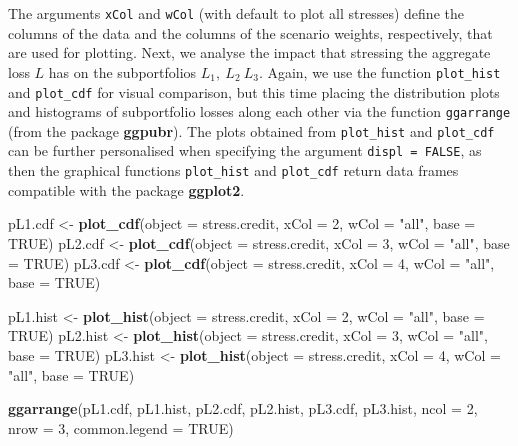 \documentclass[
]{article}
\newenvironment{Shaded}{\begin{snugshade}}{\end{snugshade}}
\newcommand{\DataTypeTok}[1]{\textcolor[rgb]{0.13,0.29,0.53}{#1}}
\newcommand{\DecValTok}[1]{\textcolor[rgb]{0.00,0.00,0.81}{#1}}
\newcommand{\KeywordTok}[1]{\textcolor[rgb]{0.13,0.29,0.53}{\textbf{#1}}}
\newcommand{\NormalTok}[1]{#1}
\newcommand{\OtherTok}[1]{\textcolor[rgb]{0.56,0.35,0.01}{#1}}
\newcommand{\StringTok}[1]{\textcolor[rgb]{0.31,0.60,0.02}{#1}}
\begin{document}
The arguments \texttt{xCol} and \texttt{wCol} (with default to plot all stresses) define the columns of the data and the columns of the scenario weights, respectively, that are used for plotting. Next, we analyse the impact that stressing the aggregate loss \(L\) has on the subportfolios \(L_1,~ L_2~L_3\). Again, we use the function \texttt{plot\_hist} and \texttt{plot\_cdf} for visual comparison, but this time placing the distribution plots and histograms of subportfolio losses along each other via the function \texttt{ggarrange} (from the package \textbf{ggpubr}). The plots obtained from \texttt{plot\_hist} and \texttt{plot\_cdf} can be further personalised when specifying the argument \texttt{displ\ =\ FALSE}, as then the graphical functions \texttt{plot\_hist} and \texttt{plot\_cdf} return data frames compatible with the package \textbf{ggplot2}.

\begin{Shaded}
\begin{Highlighting}[]
\NormalTok{pL1.cdf <-}\StringTok{ }\KeywordTok{plot_cdf}\NormalTok{(}\DataTypeTok{object =}\NormalTok{ stress.credit, }\DataTypeTok{xCol =} \DecValTok{2}\NormalTok{, }\DataTypeTok{wCol =} \StringTok{"all"}\NormalTok{, }\DataTypeTok{base =} \OtherTok{TRUE}\NormalTok{)}
\NormalTok{pL2.cdf <-}\StringTok{ }\KeywordTok{plot_cdf}\NormalTok{(}\DataTypeTok{object =}\NormalTok{ stress.credit, }\DataTypeTok{xCol =} \DecValTok{3}\NormalTok{, }\DataTypeTok{wCol =} \StringTok{"all"}\NormalTok{, }\DataTypeTok{base =} \OtherTok{TRUE}\NormalTok{)}
\NormalTok{pL3.cdf <-}\StringTok{ }\KeywordTok{plot_cdf}\NormalTok{(}\DataTypeTok{object =}\NormalTok{ stress.credit, }\DataTypeTok{xCol =} \DecValTok{4}\NormalTok{, }\DataTypeTok{wCol =} \StringTok{"all"}\NormalTok{, }\DataTypeTok{base =} \OtherTok{TRUE}\NormalTok{)}

\NormalTok{pL1.hist <-}\StringTok{ }\KeywordTok{plot_hist}\NormalTok{(}\DataTypeTok{object =}\NormalTok{ stress.credit, }\DataTypeTok{xCol =} \DecValTok{2}\NormalTok{, }\DataTypeTok{wCol =} \StringTok{"all"}\NormalTok{, }\DataTypeTok{base =} \OtherTok{TRUE}\NormalTok{)}
\NormalTok{pL2.hist <-}\StringTok{ }\KeywordTok{plot_hist}\NormalTok{(}\DataTypeTok{object =}\NormalTok{ stress.credit, }\DataTypeTok{xCol =} \DecValTok{3}\NormalTok{, }\DataTypeTok{wCol =} \StringTok{"all"}\NormalTok{, }\DataTypeTok{base =} \OtherTok{TRUE}\NormalTok{)}
\NormalTok{pL3.hist <-}\StringTok{ }\KeywordTok{plot_hist}\NormalTok{(}\DataTypeTok{object =}\NormalTok{ stress.credit, }\DataTypeTok{xCol =} \DecValTok{4}\NormalTok{, }\DataTypeTok{wCol =} \StringTok{"all"}\NormalTok{, }\DataTypeTok{base =} \OtherTok{TRUE}\NormalTok{)}

\KeywordTok{ggarrange}\NormalTok{(pL1.cdf, pL1.hist, pL2.cdf, pL2.hist, pL3.cdf, pL3.hist, }\DataTypeTok{ncol =} \DecValTok{2}\NormalTok{, }
    \DataTypeTok{nrow =} \DecValTok{3}\NormalTok{, }\DataTypeTok{common.legend =} \OtherTok{TRUE}\NormalTok{)}
\end{Highlighting}
\end{Shaded}
\end{document}
